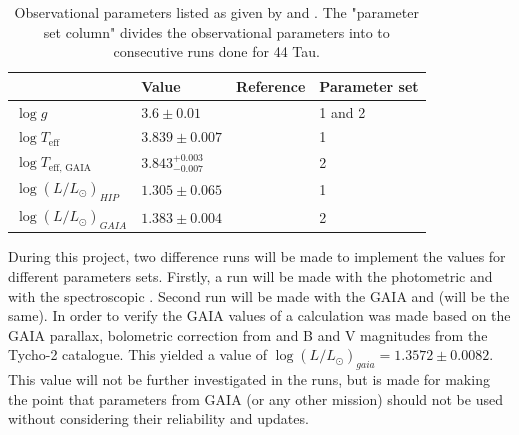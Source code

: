\begin{table}[htbp]
	\caption{Observational parameters listed as given by \citet{lenz2010delta} and \citet{brown2018gaia}. The "parameter set column" divides the observational parameters into to consecutive runs done for 44 Tau.}
	\label{obsparams}
\centering
\begin{tabular}{|l|lll|}
\hline
                                                   & Value                                             & Reference  & Parameter set\\ \hline
$\log g $                                  &  $3.6 \pm 0.01$                            & \citep{zima2007high} & 1 and 2   \\
$\log T_\text{eff}$             & $3.839  \pm 0.007$                   &   \citep{lenz2010delta}  & 1 \\
$\log T_\text{eff, GAIA}$ &  $3.843^{+0.003}_{-0.007}$ & \citep{brown2018gaia} & 2\\
$\log (L/L_\odot)_{HIP}$                  &  $1.305 \pm 0.065$                          & \citep{lenz2010delta}  & 1   \\
$\log (L/L_\odot)_{GAIA}$& $1.383 \pm 0.004$                        &  \citep{brown2018gaia}  & 2 \\ \hline
\end{tabular}
\end{table}

During this project, two difference runs will be made to implement the values for different parameters sets. Firstly, a run will be made with the \citet{lenz2010delta} photometric \teff and \lum with the spectroscopic \logg. Second run will be made with the GAIA \teff and \lum (\logg will be the same). In order to verify the GAIA values of \lum a calculation was made based on the GAIA parallax, bolometric correction from \citet{Flower96} and B and V magnitudes from the Tycho-2 catalogue. This yielded a value of $\log (L/L_\odot)_{gaia} = 1.3572 \pm 0.0082$. This value will not be further investigated in the runs, but is made for making the point that parameters from GAIA (or any other mission) should not be used without considering their reliability and updates. 



